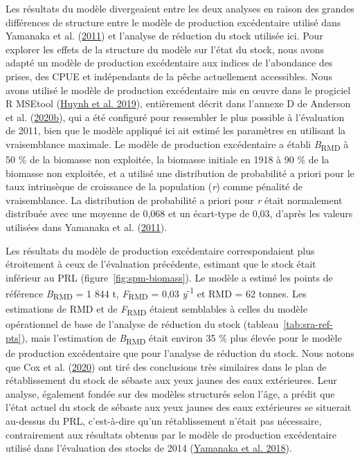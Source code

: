\documentclass[french,11pt]{book}
\begin{document}
Les résultats du modèle divergeaient entre les deux analyses en raison des grandes différences de structure entre le modèle de production excédentaire utilisé dans Yamanaka et al. (\protect\hyperlink{ref-yamanaka2011}{2011}) et l'analyse de réduction du stock utilisée ici. Pour explorer les effets de la structure du modèle sur l'état du stock, nous avons adapté un modèle de production excédentaire aux indices de l'abondance des prises, des CPUE et indépendants de la pêche actuellement accessibles. Nous avons utilisé le modèle de production excédentaire mis en œuvre dans le progiciel R MSEtool (\protect\hyperlink{ref-huynh_msetool_2019}{Huynh et al. 2019}), entièrement décrit dans l'annexe D de Anderson et al. (\protect\hyperlink{ref-anderson2020gfmp}{2020b}), qui a été configuré pour ressembler le plus possible à l'évaluation de 2011, bien que le modèle appliqué ici ait estimé les paramètres en utilisant la vraisemblance maximale. Le modèle de production excédentaire a établi \emph{B}\textsubscript{RMD} à 50 \% de la biomasse non exploitée, la biomasse initiale en 1918 à 90 \% de la biomasse non exploitée, et a utilisé une distribution de probabilité a priori pour le taux intrinsèque de croissance de la population (\emph{r}) comme pénalité de vraisemblance. La distribution de probabilité a priori pour \emph{r} était normalement distribuée avec une moyenne de 0,068 et un écart-type de 0,03, d'après les valeurs utilisées dans Yamanaka et al. (\protect\hyperlink{ref-yamanaka2011}{2011}).

Les résultats du modèle de production excédentaire correspondaient plus étroitement à ceux de l'évaluation précédente, estimant que le stock était inférieur au PRL (figure~\ref{fig:spm-biomass}). Le modèle a estimé les points de référence \emph{B}\textsubscript{RMD} = 1 844 t, \emph{F}\textsubscript{RMD} = 0,03 \emph{y}\textsuperscript{-1} et RMD = 62 tonnes. Les estimations de RMD et de \emph{F}\textsubscript{RMD} étaient semblables à celles du modèle opérationnel de base de l'analyse de réduction du stock (tableau~\ref{tab:sra-ref-pts}), mais l'estimation de \emph{B}\textsubscript{RMD} était environ 35 \% plus élevée pour le modèle de production excédentaire que pour l'analyse de réduction du stock. Nous notons que Cox et al. (\protect\hyperlink{ref-cox2020}{2020}) ont tiré des conclusions très similaires dans le plan de rétablissement du stock de sébaste aux yeux jaunes des eaux extérieures. Leur analyse, également fondée sur des modèles structurés selon l'âge, a prédit que l'état actuel du stock de sébaste aux yeux jaunes des eaux extérieures se situerait au-dessus du PRL, c'est-à-dire qu'un rétablissement n'était pas nécessaire, contrairement aux résultats obtenus par le modèle de production excédentaire utilisé dans l'évaluation des stocks de 2014 (\protect\hyperlink{ref-yamanaka2018yelloweyeoutside}{Yamanaka et al. 2018}).
\end{document}
